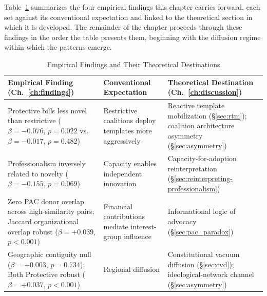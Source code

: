Table~\ref{tab:findings_crosswalk} summarizes the four empirical findings this chapter carries forward, each set against its conventional expectation and linked to the theoretical section in which it is developed. The remainder of the chapter proceeds through these findings in the order the table presents them, beginning with the diffusion regime within which the patterns emerge.

\begin{table}[!htbp]
\centering
\caption{Empirical Findings and Their Theoretical Destinations}
\label{tab:findings_crosswalk}
\renewcommand{\arraystretch}{1.4}
\setlength{\tabcolsep}{8pt}
\small
\begin{tabular}{>{\raggedright\arraybackslash}p{4.5cm} >{\raggedright\arraybackslash}p{3.8cm} >{\raggedright\arraybackslash}p{4.5cm}}
\toprule
\textbf{Empirical Finding (Ch.~\ref{ch:findings})} & \textbf{Conventional Expectation} & \textbf{Theoretical Destination (Ch.~\ref{ch:discussion})} \\
\midrule
Protective bills less novel than restrictive ($\beta = -0.076$, $p = 0.022$ vs.\ $\beta = -0.017$, $p = 0.482$) & Restrictive coalitions deploy templates more aggressively \parencite{jansaCopyPasteLawmaking2019} & Reactive template mobilization (\S\ref{sec:rtm}); coalition architecture asymmetry (\S\ref{sec:asymmetry}) \\
\addlinespace[6pt]
Professionalism inversely related to novelty ($\beta = -0.155$, $p = 0.069$) & Capacity enables independent innovation \parencite{squireMeasuringStateLegislative2007} & Capacity-for-adoption reinterpretation (\S\ref{sec:reinterpreting-professionalism}) \\
\addlinespace[6pt]
Zero PAC donor overlap across high-similarity pairs; Jaccard organizational overlap robust ($\beta = +0.039$, $p < 0.001$) & Financial contributions mediate interest-group influence & Informational logic of advocacy (\S\ref{sec:pac_paradox}) \\
\addlinespace[6pt]
Geographic contiguity null ($\beta = +0.003$, $p = 0.734$); Both Protective robust ($\beta = +0.037$, $p < 0.001$) & Regional diffusion \parencite{walkerDiffusionInnovationsAmerican1969,berryStateLotteryAdoptions1990} & Constitutional vacuum diffusion (\S\ref{sec:cvd}); ideological-network channel (\S\ref{sec:asymmetry}) \\
\bottomrule
\end{tabular}
\end{table}

\newpage
